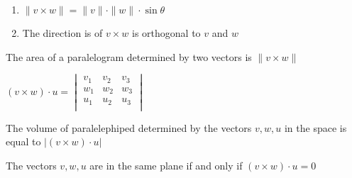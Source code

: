 \begin{theorem}
  \hspace{10em}
  \begin{enumerate}
    \item $\|v \times w\| = \| v \| \cdot \| w \| \cdot \sin \theta$
    \item The direction is of $v \times w$ is orthogonal to $v$ and $w$
  \end{enumerate}

  \par The area of a paralelogram determined by two vectors is $\|v \times w \|$

  \begin{definition}
    $(v \times w) \cdot u = 
    \begin{vmatrix}
      v_{\scriptstyle{1}} & v_{\scriptstyle{2}} & v_{\scriptstyle{3}} \\ 
      w_{\scriptstyle{1}} & w_{\scriptstyle{2}} & w_{\scriptstyle{3}} \\ 
      u_{\scriptstyle{1}} & u_{\scriptstyle{2}} & u_{\scriptstyle{3}} \\ 
    \end{vmatrix}$

    \begin{note}
      The volume of paralelephiped determined by the vectors ${v, w, u}$ in the space is equal to $|(v \times w) \cdot u|$
    \end{note}

    \begin{corollary}
      The vectors ${v, w, u}$ are in the same plane if and only if $(v \times w) \cdot u = 0$
    \end {corollary}
  \end{definition}
\end{theorem}

\newpage
